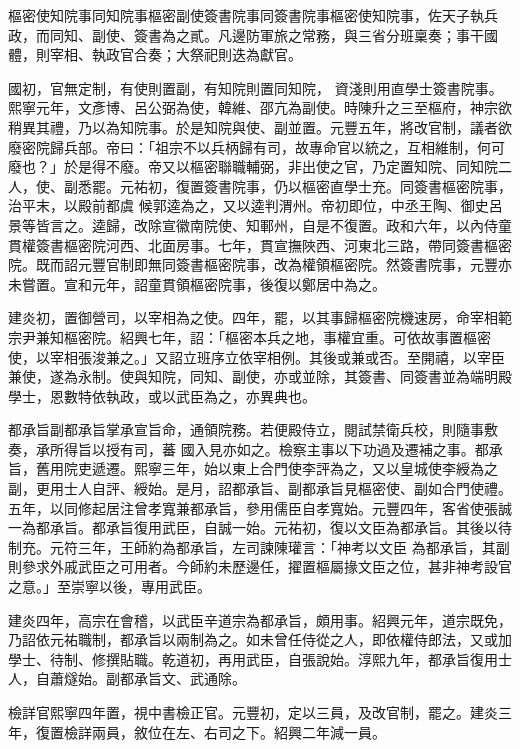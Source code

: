 \begin{pinyinscope}
 樞密使知院事同知院事樞密副使簽書院事同簽書院事樞密使知院事，佐天子執兵政，而同知、副使、簽書為之貳。凡邊防軍旅之常務，與三省分班稟奏；事干國體，則宰相、執政官合奏；大祭祀則迭為獻官。



 國初，官無定制，有使則置副，有知院則置同知院，
 資淺則用直學士簽書院事。熙寧元年，文彥博、呂公弼為使，韓維、邵亢為副使。時陳升之三至樞府，神宗欲稍異其禮，乃以為知院事。於是知院與使、副並置。元豐五年，將改官制，議者欲廢密院歸兵部。帝曰：「祖宗不以兵柄歸有司，故專命官以統之，互相維制，何可廢也？」於是得不廢。帝又以樞密聯職輔弼，非出使之官，乃定置知院、同知院二人，使、副悉罷。元祐初，復置簽書院事，仍以樞密直學士充。同簽書樞密院事，治平末，以殿前都虞
 候郭逵為之，又以逵判渭州。帝初即位，中丞王陶、御史呂景等皆言之。逵歸，改除宣徽南院使、知鄆州，自是不復置。政和六年，以內侍童貫權簽書樞密院河西、北面房事。七年，貫宣撫陜西、河東北三路，帶同簽書樞密院。既而詔元豐官制即無同簽書樞密院事，改為權領樞密院。然簽書院事，元豐亦未嘗置。宣和元年，詔童貫領樞密院事，後復以鄭居中為之。



 建炎初，置御營司，以宰相為之使。四年，罷，以其事歸樞密院機速房，命宰相範
 宗尹兼知樞密院。紹興七年，詔：「樞密本兵之地，事權宜重。可依故事置樞密使，以宰相張浚兼之。」又詔立班序立依宰相例。其後或兼或否。至開禧，以宰臣兼使，遂為永制。使與知院，同知、副使，亦或並除，其簽書、同簽書並為端明殿學士，恩數特依執政，或以武臣為之，亦異典也。



 都承旨副都承旨掌承宣旨命，通領院務。若便殿侍立，閱試禁衛兵校，則隨事敷奏，承所得旨以授有司，蕃
 國入見亦如之。檢察主事以下功過及遷補之事。都承旨，舊用院吏遞遷。熙寧三年，始以東上合門使李評為之，又以皇城使李綬為之副，更用士人自評、綬始。是月，詔都承旨、副都承旨見樞密使、副如合門使禮。五年，以同修起居注曾孝寬兼都承旨，參用儒臣自孝寬始。元豐四年，客省使張誠一為都承旨。都承旨復用武臣，自誠一始。元祐初，復以文臣為都承旨。其後以待制充。元符三年，王師約為都承旨，左司諫陳瓘言：「神考以文臣
 為都承旨，其副則參求外戚武臣之可用者。今師約未歷邊任，擢置樞屬掾文臣之位，甚非神考設官之意。」至崇寧以後，專用武臣。



 建炎四年，高宗在會稽，以武臣辛道宗為都承旨，頗用事。紹興元年，道宗既免，乃詔依元祐職制，都承旨以兩制為之。如未曾任侍從之人，即依權侍郎法，又或加學士、待制、修撰貼職。乾道初，再用武臣，自張說始。淳熙九年，都承旨復用士人，自蕭燧始。副都承旨文、武通除。



 檢詳官熙寧四年置，視中書檢正官。元豐初，定以三員，及改官制，罷之。建炎三年，復置檢詳兩員，敘位在左、右司之下。紹興二年減一員。




\end{pinyinscope}
